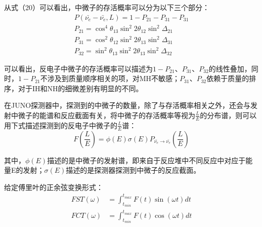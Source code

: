 \documentclass[10pt,a4paper]{article}
\begin{document}
从式（20）可以看出，中微子的存活概率可以分为以下三个部分\cite{Zhan:2008id}：
 \begin{equation}
 \label{con:eq25}
 \begin{split}
P(\bar{\nu_e}-\bar{\nu_e},L)=1-P_{21}-P_{31}-P_{31}\\
P_{21}=\cos^4{\theta_{13}}\sin^2{2\theta_{12}}\sin^2{\Delta_{21}}\\
P_{31}=\cos^2{\theta_{12}}\sin^2{2\theta_{13}}\sin^2{\Delta_{31}}\\
P_{32}=\sin^2\theta_{13}\sin^2{2\theta_{13}}\sin^2{\Delta_{32}} 
 \end{split}
 \end{equation}

可以看出，反电子中微子的存活概率可以描述为$1-P_{21}$、$P_{31}$、$P_{32}$的线性叠加，同时，$1-P_{21}$不涉及到质量顺序相关的项，对MH不敏感；$P_{31}$、$P_{32}$依赖于质量的排序，对于IH和NH的细微差别有明显的不同。

在JUNO探测器中，探测到的中微子的数量，除了与存活概率相关之外，还会与发射中微子的能谱和反应截面有关，将中微子的存活概率等视为$\frac{L}{E}$的分布谱，则可以用下式描述探测到的反电子中微子的$\frac{L}{E}$谱：
\begin{equation}
\label{con:eq26}
F(\frac{L}{E})=\phi(E)\sigma(E)P_{\bar{\nu_e}\rightarrow\bar{\nu_e}}(\frac{L}{E})
\end{equation}

其中，$\phi(E)$描述的是中微子的发射谱，即来自于反应堆中不同反应中对应于能量E的发射；$\sigma(E)$描述的是探测器探测到中微子的反应截面。

给定傅里叶的正余弦变换形式\cite{Zhan:2009rs}\cite{Zhan:2008id}：
\begin{equation}
\label{con:eq27}
\begin{split}
FST(\omega)&=\int_{t_{min}}^{t_{max}}F(t)\sin(\omega t)dt\\
FCT(\omega)&=\int_{t_{min}}^{t_{max}}F(t)\cos(\omega t)dt
\end{split}
\end{equation}
\end{document}
